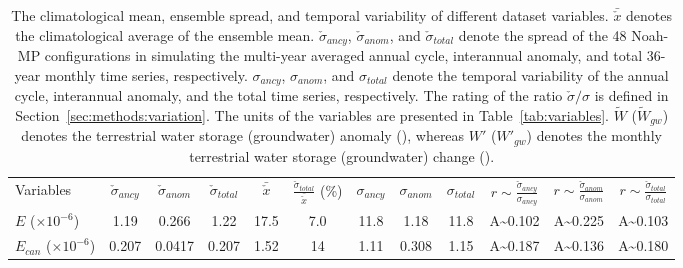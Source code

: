 \documentclass[essd, manuscript]{copernicus}
\let\unit\undefined
\begin{document}
\begin{table}[t]
  \caption{The climatological mean, ensemble spread, and temporal variability of different dataset variables. \(\bar{\check{x}}\) denotes the climatological average of the ensemble mean. \(\check{\sigma}_{ancy}\), \(\check{\sigma}_{anom}\), and \(\check{\sigma}_{total}\) denote the spread of the 48 Noah-MP configurations in simulating the multi-year averaged annual cycle, interannual anomaly, and total 36-year monthly time series, respectively. \(\sigma_{ancy}\), \(\sigma_{anom}\), and \(\sigma_{total}\) denote the temporal variability of the annual cycle, interannual anomaly, and the total time series, respectively. The rating of the ratio \(\check{\sigma}/\sigma\) is defined in Section~\ref{sec:methods:variation}. The units of the variables are presented in Table~\ref{tab:variables}. \(\tilde{W}\) (\(\tilde{W}_{gw}\)) denotes the terrestrial water storage (groundwater) anomaly (\unit{kg.m^{-2}}), whereas \(W'\) (\(W'_{gw}\)) denotes the monthly terrestrial water storage (groundwater) change (\unit{kg.m^{-2}.s^{-1}}).}
  \label{tab:statistics}
  \setlength{\tabcolsep}{3pt}
  \begin{tabular}{lccccccccccc}
    \tophline
    Variables                           & \(\check{\sigma}_{ancy}\)                              & \(\check{\sigma}_{anom}\)                               & \(\check{\sigma}_{total}\)
                                        & \(\bar{\check{x}}\)                                    & \(\frac{\check{\sigma}_{total}}{\bar{\check{x}}}\) (\%)
                                        & \(\sigma_{ancy}\)                                      & \(\sigma_{anom}\)                                       & \(\sigma_{total}\)
                                        & \(r\sim\frac{\check{\sigma}_{ancy}}{\sigma_{ancy}}\)
                                        & \(r\sim\frac{\check{\sigma}_{anom}}{\sigma_{anom}}\)
                                        & \(r\sim\frac{\check{\sigma}_{total}}{\sigma_{total}}\) \\
    \middlehline
    \(E\) (\(\times 10^{-6}\))          & \num{1.19}                                             & \num{0.266}                                             & \num{1.22}                 & \num{17.5}     & \num{7.0} & \num{11.8}  & \num{1.18}  & \num{11.8}  & A\textasciitilde\num{0.102} & A\textasciitilde\num{0.225} & A\textasciitilde\num{0.103} \\
    \(E_{can}\) (\(\times 10^{-6}\))    & \num{0.207}                                            & \num{0.0417}                                            & \num{0.207}                & \num{1.52}     & \num{14}  & \num{1.11}  & \num{0.308} & \num{1.15}  & A\textasciitilde\num{0.187} & A\textasciitilde\num{0.136} & A\textasciitilde\num{0.180} \\

\end{tabular}
\end{table}
\end{document}
